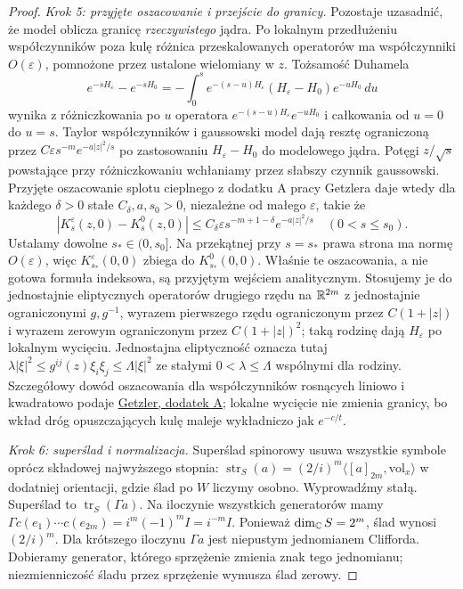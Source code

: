 \begin{proof}
\emph{Krok 5: przyjęte oszacowanie i przejście do granicy.}
Pozostaje uzasadnić, że model oblicza granicę
\emph{rzeczywistego} jądra. Po lokalnym
przedłużeniu współczynników poza kulę
różnica przeskalowanych operatorów ma
współczynniki \(O(\varepsilon)\), pomnożone
przez ustalone wielomiany w \(z\).
Tożsamość Duhamela
\[
 e^{-sH_\varepsilon}-e^{-sH_0}
 =-\int_0^s e^{-(s-u)H_\varepsilon}
      (H_\varepsilon-H_0)e^{-uH_0}\,du
\]
wynika z różniczkowania po $u$ operatora
$e^{-(s-u)H_\varepsilon}e^{-uH_0}$
i całkowania od $u=0$ do $u=s$.
Taylor współczynników i gaussowski model dają
resztę ograniczoną przez
$C\varepsilon s^{-m}e^{-a|z|^2/s}$
po zastosowaniu $H_\varepsilon-H_0$ do modelowego jądra.
Potęgi $z/\sqrt s$ powstające przy różniczkowaniu
wchłaniamy przez słabszy czynnik gaussowski.
Przyjęte oszacowanie splotu cieplnego z dodatku A
pracy Getzlera daje wtedy dla każdego $\delta>0$
stałe $C_\delta,a,s_0>0$, niezależne od małego $\varepsilon$, takie że
\[
 |K^\varepsilon_s(z,0)-K^0_s(z,0)|
 \le C_\delta\varepsilon
       s^{-m+1-\delta}e^{-a|z|^2/s}
 \quad (0<s\le s_0).
\]
Ustalamy dowolne $s_*\in(0,s_0]$.
Na przekątnej przy $s=s_*$ prawa strona ma normę
$O(\varepsilon)$, więc $K^\varepsilon_{s_*}(0,0)$
zbiega do $K^0_{s_*}(0,0)$.
Właśnie te
oszacowania, a nie gotowa formuła indeksowa,
są przyjętym wejściem analitycznym.
Stosujemy je do jednostajnie eliptycznych
operatorów drugiego rzędu na \(\mathbb{R}^{2m}\)
z jednostajnie ograniczonymi \(g,g^{-1}\),
wyrazem pierwszego rzędu ograniczonym przez
\(C(1+|z|)\) i wyrazem zerowym ograniczonym
przez \(C(1+|z|)^2\); taką rodzinę dają
\(H_\varepsilon\) po lokalnym wycięciu.
Jednostajna eliptyczność oznacza tutaj
$\lambda|\xi|^2\leq g^{ij}(z)\xi_i\xi_j\leq\Lambda|\xi|^2$
ze stałymi $0<\lambda\leq\Lambda$ wspólnymi dla rodziny.
Szczegółowy dowód oszacowania dla
współczynników rosnących liniowo i kwadratowo
podaje \href{https://www.maths.ed.ac.uk/~v1ranick/papers/getzler.pdf}
{Getzler, dodatek A}; lokalne wycięcie nie
zmienia granicy, bo wkład dróg opuszczających
kulę maleje wykładniczo jak \(e^{-c/t}\).

\emph{Krok 6: superślad i normalizacja.}
Superślad spinorowy usuwa wszystkie symbole
oprócz składowej najwyższego stopnia:
\(\operatorname{str}_S(a)
=(2/i)^m\langle[a]_{2m},\mathrm{vol}_x\rangle\)
w dodatniej orientacji, gdzie ślad po $W$ liczymy osobno.
Wyprowadźmy stałą. Superślad to $\operatorname{tr}_S(\Gamma a)$.
Na iloczynie wszystkich generatorów mamy
$\Gamma c(e_1)\cdots c(e_{2m})=i^m(-1)^m I=i^{-m}I$.
Ponieważ $\dim_{\mathbb{C}} S=2^m$, ślad wynosi $(2/i)^m$.
Dla krótszego iloczynu $\Gamma a$ jest niepustym jednomianem
Clifforda. Dobieramy generator, którego sprzężenie zmienia
znak tego jednomianu; niezmienniczość śladu przez sprzężenie
wymusza ślad zerowy.


\end{proof}
